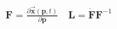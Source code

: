 \documentclass[preview]{standalone}
\begin{document}
\begin{align*}
\mathbf{F} = \frac{\partial \vec{\mathbf{x}}(\mathbf{p}, t)}{\partial \mathbf{p}} \quad \mathbf{L} = \dot{\mathbf{F}} \mathbf{F}^{-1}
\end{align*}
\end{document}
